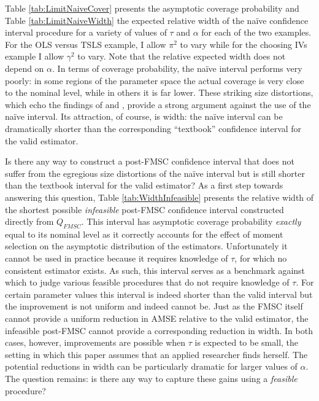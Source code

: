 Table \ref{tab:LimitNaiveCover} presents the asymptotic coverage probability and Table \ref{tab:LimitNaiveWidth} the expected relative width of the na\"{i}ve confidence interval procedure for a variety of values of $\tau$ and $\alpha$ for each of the two examples.
For the OLS versus TSLS example, I allow $\pi^2$ to vary while for the choosing IVs example I allow $\gamma^2$ to vary.
Note that the relative expected width does not depend on $\alpha$.
In terms of coverage probability, the na\"{i}ve interval performs very poorly: in some regions of the parameter space the actual coverage is very close to the nominal level, while in others it is far lower.
These striking size distortions, which echo the findings of \cite{Guggenberger2010} and \cite{Guggenberger2012}, provide a strong argument against the use of the na\"{i}ve interval.
Its attraction, of course, is width: the na\"{i}ve interval can be dramatically shorter than the corresponding ``textbook'' confidence interval for the valid estimator.


Is there any way to construct a post-FMSC confidence interval that does not suffer from the egregious size distortions of the na\"{i}ve interval but is still shorter than the textbook interval for the valid estimator?
As a first step towards answering this question, Table \ref{tab:WidthInfeasible} presents the relative width of the shortest possible \emph{infeasible} post-FMSC confidence interval constructed directly from $Q_{FMSC}$.
This interval has asymptotic coverage probability \emph{exactly} equal to its nominal level as it correctly accounts for the effect of moment selection on the asymptotic distribution of the estimators.
Unfortunately it cannot be used in practice because it requires knowledge of $\tau$, for which no consistent estimator exists.
As such, this interval serves as a benchmark against which to judge various feasible procedures that do not require knowledge of $\tau$.
For certain parameter values this interval is indeed shorter than the valid interval but the improvement is not uniform and indeed cannot be.
Just as the FMSC itself cannot provide a uniform reduction in AMSE relative to the valid estimator, the infeasible post-FMSC cannot provide a corresponding reduction in width.
In both cases, however, improvements are possible when $\tau$ is expected to be small, the setting in which this paper assumes that an applied researcher finds herself. 
The potential reductions in width can be particularly dramatic for larger values of $\alpha$.
The question remains: is there any way to capture these gains using a \emph{feasible} procedure?


